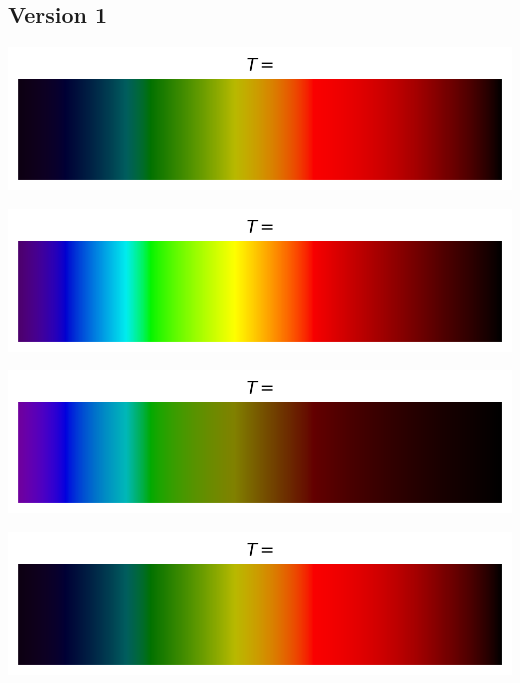 \documentclass[12pt,a4paper,fleqn]{article}
\begin{document}
\begin{landscape}

\section*{Version 1}

\begin{center}
\begin{multicols}{3}
\includegraphics[width=\linewidth]{images/spectrum_black_body_temp3000K_notemp.png}

\includegraphics[width=\linewidth]{images/spectrum_black_body_temp5000K_notemp.png}

\includegraphics[width=\linewidth]{images/spectrum_black_body_temp10000K_notemp.png}
\end{multicols}
\end{center}

\begin{center}
\begin{multicols}{3}
\includegraphics[width=\linewidth]{images/spectrum_black_body_temp3000K_notemp.png}


\end{multicols}
\end{center}
\end{landscape}
\end{document}
